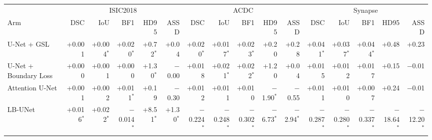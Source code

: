 \begin{tabular}{lrrrrrrrrrrrrrrr}
\toprule
 & \multicolumn{5}{c}{ISIC2018} & \multicolumn{5}{c}{ACDC} & \multicolumn{5}{c}{Synapse} \\
Arm & DSC & IoU & BF1 & HD95 & ASSD & DSC & IoU & BF1 & HD95 & ASSD & DSC & IoU & BF1 & HD95 & ASSD \\
\midrule
U-Net + GSL & +0.001 & +0.004$^{*}$ & +0.020$^{*}$ & +0.72$^{*}$ & +0.04 & +0.020$^{*}$ & +0.017$^{*}$ & +0.023$^{*}$ & +0.20 & +0.28 & +0.041$^{*}$ & +0.037$^{*}$ & +0.044$^{*}$ & +0.48 & +0.23 \\
U-Net + Boundary Loss & +0.000 & +0.001 & +0.000 & +1.30$^{*}$ & $-$0.00 & +0.018 & +0.021$^{*}$ & +0.022$^{*}$ & +1.20 & +0.04 & +0.015 & +0.012 & +0.017 & +0.15 & $-$0.01 \\
Attention U-Net & +0.001 & +0.002 & +0.011$^{*}$ & +0.19 & $-$0.30 & +0.012 & +0.011 & +0.010 & $-$1.90$^{*}$ & $-$0.55 & +0.011 & +0.010 & +0.007 & +0.24 & $-$0.01 \\
LB-UNet & +0.016$^{*}$ & +0.022$^{*}$ & $-$0.014$^{*}$ & +8.51$^{*}$ & +1.30$^{*}$ & $-$0.224$^{*}$ & $-$0.248$^{*}$ & $-$0.302$^{*}$ & $-$6.73$^{*}$ & $-$2.94$^{*}$ & $-$0.287$^{*}$ & $-$0.280$^{*}$ & $-$0.337$^{*}$ & $-$18.64$^{*}$ & $-$12.20$^{*}$ \\
\bottomrule
\end{tabular}
